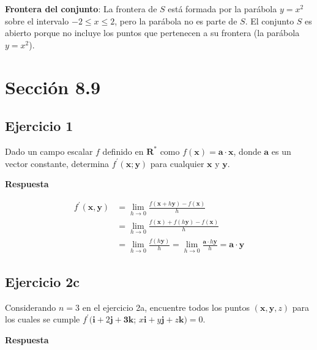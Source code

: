 \documentclass{report}
\begin{document}
    \textbf{Frontera del conjunto}: La frontera de \( S \) está formada por la parábola \( y = x^2 \) sobre el intervalo \( -2 \leq x \leq 2 \), pero la parábola no es parte de \( S \). El conjunto \( S \) es abierto porque no incluye los puntos que pertenecen a su frontera (la parábola \( y = x^2 \)).
    
    \section*{Sección 8.9}
    \subsection*{Ejercicio 1}
    Dado un campo escalar $f$ definido en $\mathbf{R}^{*}$ como $f(\boldsymbol{x})=\boldsymbol{a} \cdot \boldsymbol{x}$, donde $\boldsymbol{a}$ es un vector constante, determina $f^{\prime}(\boldsymbol{x}; \boldsymbol{y})$ para cualquier $\boldsymbol{x}$ y $\boldsymbol{y}$.

    \textbf{Respuesta}

    $$
    \begin{aligned}
    f^{\prime}(\boldsymbol{x}, \boldsymbol{y}) &= \lim_{h \to 0} \frac{f(\boldsymbol{x} + h \boldsymbol{y}) - f(\boldsymbol{x})}{h} \\
    &= \lim_{h \to 0} \frac{f(\boldsymbol{x}) + f(h \boldsymbol{y}) - f(\boldsymbol{x})}{h} \\
    &= \lim_{h \to 0} \frac{f(h \boldsymbol{y})}{h} = \lim_{h \to 0} \frac{\boldsymbol{a} \cdot h \boldsymbol{y}}{h} = \boldsymbol{a} \cdot \boldsymbol{y}
    \end{aligned}
    $$
    \subsection*{Ejercicio 2c}
    Considerando $n=3$ en el ejercicio 2a, encuentre todos los puntos $(\boldsymbol{x}, \boldsymbol{y}, z)$ para los cuales se cumple $f^{\prime}(\boldsymbol{i}+2 \boldsymbol{j}+\mathbf{3 k}$; $x \boldsymbol{i}+y \boldsymbol{j}+z \boldsymbol{k})=0$.

    \textbf{Respuesta}
\end{document}
